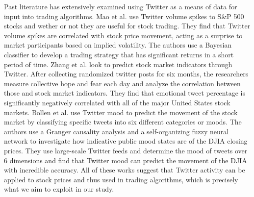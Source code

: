 \documentclass[../thesis.tex]{subfiles}
\begin{document}
Past literature has extensively examined using Twitter as a means of data for input into trading algorithms. Mao et al. \cite{Mao2013} use Twitter volume spikes to S\&P 500 stocks and wether or not they are useful for stock trading. They find that Twitter volume spikes are correlated with stock price movement, acting as a surprise to market participants based on implied volatility. The authors use a Bayesian classifier to develop a trading strategy that has significant returns in a short period of time. Zhang et al. \cite{Zhang2011} look to predict stock market indicators through Twitter. After collecting randomized twitter posts for six months, the researchers measure collective hope and fear each day and analyze the correlation between those and stock market indicators. They find that emotional tweet percentage is significantly negatively correlated with all of the major United States stock markets. Bollen et al. \cite{Bollen} use Twitter mood to predict the movement of the stock market by classifying specific tweets into six different categories or moods. The authors use a Granger causality analysis and a self-organizing fuzzy neural network to investigate how indicative public mood states are of the DJIA closing prices. They use large-scale Twitter feeds and determine the mood of tweets over 6 dimensions and find that Twitter mood can predict the movement of the DJIA with incredible accuracy. All of these works suggest that Twitter activity can be applied to stock prices and thus used in trading algorithms, which is precisely what we aim to exploit in our study. 
\end{document}
